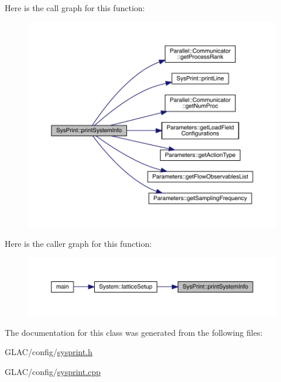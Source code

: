 Here is the call graph for this function\+:
\nopagebreak
\begin{figure}[H]
\begin{center}
\leavevmode
\includegraphics[width=350pt]{class_sys_print_a4572572643f6f4685081a3ae419e5ca9_cgraph}
\end{center}
\end{figure}
Here is the caller graph for this function\+:
\nopagebreak
\begin{figure}[H]
\begin{center}
\leavevmode
\includegraphics[width=350pt]{class_sys_print_a4572572643f6f4685081a3ae419e5ca9_icgraph}
\end{center}
\end{figure}


The documentation for this class was generated from the following files\+:\begin{DoxyCompactItemize}
\item 
G\+L\+A\+C/config/\mbox{\hyperlink{sysprint_8h}{sysprint.\+h}}\item 
G\+L\+A\+C/config/\mbox{\hyperlink{sysprint_8cpp}{sysprint.\+cpp}}\end{DoxyCompactItemize}
